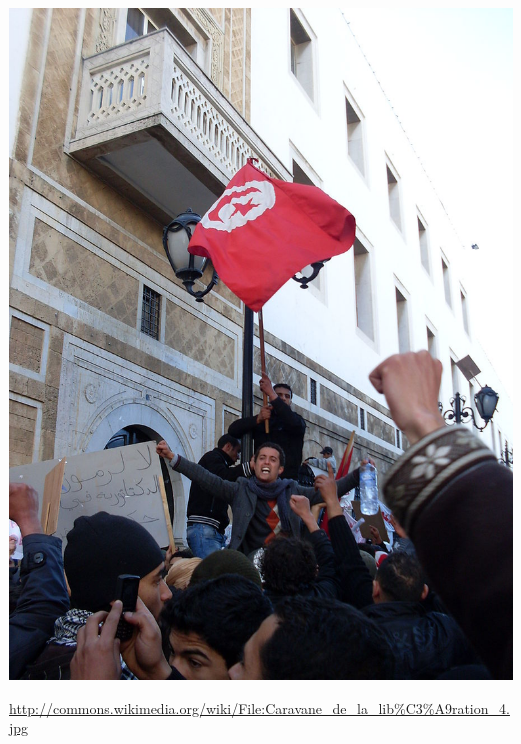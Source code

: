 \documentclass[aspectratio=169]{beamer}
\begin{document}
\begin{frame}

\begin{center}
\includegraphics[height=0.8\textheight]{figures/tunisia_protests}
\end{center}

\tiny{\url{http://commons.wikimedia.org/wiki/File:Caravane_de_la_lib\%C3\%A9ration_4.jpg}}


\end{frame}
\end{document}
